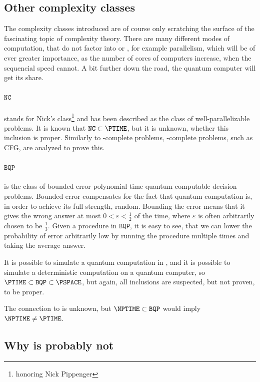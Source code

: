 \subsection{Other complexity classes}
The complexity classes introduced are of course only scratching the surface 
of the fascinating topic of complexity theory. There are many different modes 
of computation, that do not factor into \PTIME or \NPTIME, for example 
parallelism, which will be of ever greater importance, as the number of cores 
of computers increase, when the sequencial speed cannot. A bit further down 
the road, the quantum computer will get its share.

\paragraph{$\mathtt{NC}$}
stands for Nick's class\footnote{honoring Nick Pippenger} and
has been described as the class of well-parallelizable 
problems\citationneeded. It is known that $\mathtt{NC} \subset \PTIME$, but it is unknown, 
whether this inclusion is proper. Similarly to \NPTIME-complete problems, 
\PTIME-complete problems, such as CFG, are analyzed to prove this. 

\paragraph{$\mathtt{BQP}$}
is the class of bounded-error polynomial-time quantum computable decision 
problems. Bounded error compensates for the fact that quantum computation is, 
in order to achieve its full strength, random. Bounding the error means that 
it gives the wrong answer at most $0<\varepsilon<\frac{1}{2}$ of the time, where 
$\varepsilon$ is often arbitrarily chosen to be $\frac{1}{3}$. Given a 
procedure in $\mathtt{BQP}$, it is easy to see, that we can lower the 
probability of error arbitrarily low by running the procedure multiple times 
and taking the average answer.

It is possible to simulate a quantum computation in \PSPACE, and it is 
possible to simulate a deterministic computation on a quantum computer, so 
$\PTIME \subset \mathtt{BQP} \subset \PSPACE$, but again, all inclusions are 
suspected, but not proven, to be proper.

The connection to \NPTIME is unknown, but $\NPTIME\subset \mathtt{BQP}$ would 
imply $\NPTIME\neq \PTIME$.

\subsection{Why \PTIME is probably not \NPTIME}
\cite{impagliazzo1995personal}
